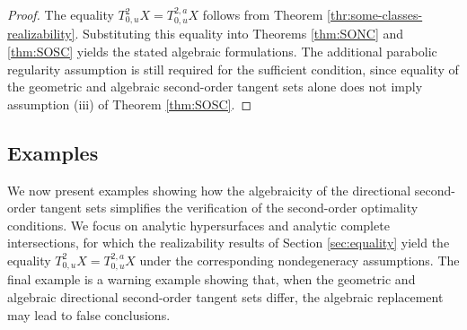 \documentclass[10pt,reqno]{amsart}
\theoremstyle{break-italic}
\theoremstyle{break-italic}
\theoremstyle{break-italic}
\theoremstyle{break-italic}
\theoremstyle{break-italic}
\theoremstyle{break-italic}
\theoremstyle{break-italic}
\theoremstyle{break-italic}
\theoremstyle{break-roman}
\theoremstyle{standard}
\theoremstyle{varthm-roman}
\theoremstyle{varthm-italic}
\theoremstyle{varthm-roman-break}
\theoremstyle{varthm-italic-break}
\theoremstyle{varthm-roman-no-punctuation}
\theoremstyle{varthm-italic-no-punctuation}
\numberwithin{equation}{section}
\begin{document}
\begin{proof}
The equality
\(
T^2_{0,u}X=T^{2,a}_{0,u}X
\)
follows from Theorem \ref{thr:some-classes-realizability}. Substituting this
equality into Theorems \ref{thm:SONC} and \ref{thm:SOSC} yields the stated
algebraic formulations. The additional parabolic regularity assumption is still
required for the sufficient condition, since equality of the geometric and
algebraic second-order tangent sets alone does not imply assumption
{\rm(iii)} of Theorem \ref{thm:SOSC}.
\end{proof}


\subsection{Examples}

We now present examples showing how the algebraicity of the directional
second-order tangent sets simplifies the verification of the second-order
optimality conditions. We focus on analytic hypersurfaces and analytic complete
intersections, for which the realizability results of Section \ref{sec:equality} yield the
equality
\(
T^2_{0,u}X=T^{2,a}_{0,u}X
\)
under the corresponding nondegeneracy assumptions. The final example is a
warning example showing that, when the geometric and algebraic directional
second-order tangent sets differ, the algebraic replacement may lead to false
conclusions.
\end{document}
